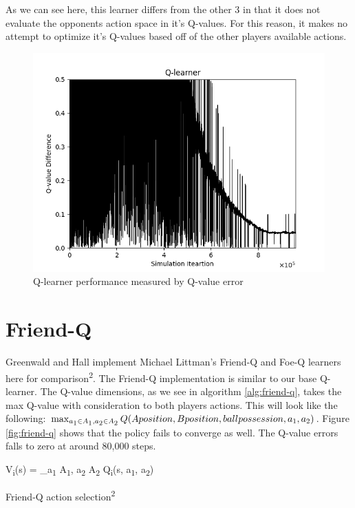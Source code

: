 \documentclass[conference]{IEEEtran}
\begin{document}
As we can see here, this learner differs from the other 3 in that it does not evaluate the opponents action space in it's Q-values. For this reason, it makes no attempt to optimize it's Q-values based off of the other players available actions.

\begin{figure}[]
    \centering
    \includegraphics[scale=0.45]{figs/Q-learner}
    \caption{Q-learner performance measured by Q-value error}
    \label{fig:q-learner}
\end{figure}

\section{Friend-Q}
Greenwald and Hall implement Michael Littman's Friend-Q and Foe-Q learners here for comparison\textsuperscript{2}. The Friend-Q implementation is similar to our base Q-learner. The Q-value dimensions, as we see in algorithm \ref{alg:friend-q}, takes the max Q-value with consideration to both players actions. This will look like the following: $\max_{a\textsubscript{1} \in A\textsubscript{1}, a\textsubscript{2} \in A\textsubscript{2}} Q(A position, B position, ball possession, a\textsubscript{1}, a\textsubscript{2})$. Figure \ref{fig:friend-q} shows that the policy fails to converge as well. The Q-value errors falls to zero at around 80,000 steps.

\begin{algorithm}
    \label{alg:friend-q}
    V\textsubscript{i}(s) = \max_{a\textsubscript{1} \in A\textsubscript{1}, a\textsubscript{2} \in A\textsubscript{2}} Q\textsubscript{i}(s, a\textsubscript{1}, a\textsubscript{2})
    \caption{Friend-Q action selection\textsuperscript{2}}
\end{algorithm}
\end{document}
